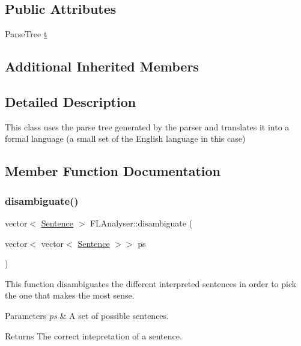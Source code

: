 \subsection*{Public Attributes}
\begin{DoxyCompactItemize}
\item 
Parse\+Tree \mbox{\hyperlink{classFLAnalyser_ad5708840f0ea357a2f81c240b16da54a}{t}}
\end{DoxyCompactItemize}
\subsection*{Additional Inherited Members}


\subsection{Detailed Description}
This class uses the parse tree generated by the parser and translates it into a formal language (a small set of the English language in this case) 

\subsection{Member Function Documentation}
\mbox{\label{classFLAnalyser_ac842959db593592a80f3e2e8508c22c1}} 
\subsubsection{\texorpdfstring{disambiguate()}{disambiguate()}}
{\footnotesize\ttfamily vector$<$ \mbox{\hyperlink{classSentence}{Sentence}} $>$ F\+L\+Analyser\+::disambiguate (\begin{DoxyParamCaption}\item[{vector$<$ vector$<$ \mbox{\hyperlink{classSentence}{Sentence}} $>$$>$}]{ps }\end{DoxyParamCaption})}



This function disambiguates the different interpreted sentences in order to pick the one that makes the most sense. 


\begin{DoxyParams}{Parameters}
{\em ps} & A set of possible sentences. \\
\hline
\end{DoxyParams}
\begin{DoxyReturn}{Returns}
The correct intepretation of a sentence. 
\end{DoxyReturn}
\mbox{\label{classFLAnalyser_a5ed65a6b9033106c9b6ca5c6a7b8e45f}} 
